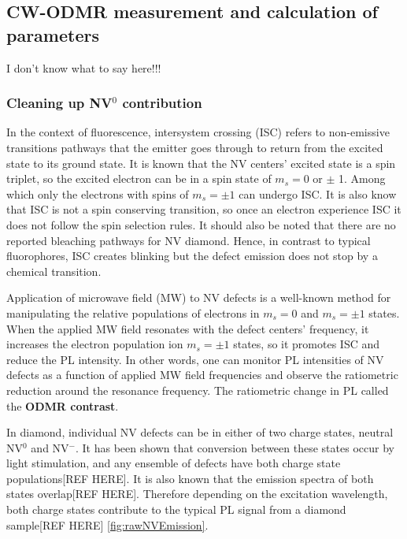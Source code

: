 \subsection{CW-ODMR measurement and calculation of parameters}
I don't know what to say here!!!
\subsubsection{Cleaning up NV$^{0}$ contribution}
In the context of fluorescence, intersystem crossing (ISC) refers to 
non-emissive transitions pathways that the emitter goes through to return from the 
excited state to its ground state. It is known that the NV centers' excited state 
is a spin triplet, so the excited electron can be in a spin state of $m_{s} = 0$ 
or $\pm$ 1. Among which only the electrons with spins of $m_{s} = \pm 1$ can
undergo ISC. It is also know that ISC is not a spin conserving transition, so 
once an electron experience ISC it does not follow the spin selection rules.
It should also be noted that there are no reported bleaching pathways for NV diamond.
Hence, in contrast to typical fluorophores, ISC creates blinking but the defect 
emission does not stop by a chemical transition. 

Application of microwave field (MW) to NV defects is a well-known method for manipulating the relative populations of electrons in $m_{s} = 0$ and 
$m_{s} = \pm 1$ states. When the applied MW field resonates with the defect 
centers' frequency, it increases the electron population ion $m_{s} = \pm 1$ 
states, so it promotes ISC and reduce the PL intensity. In other words, one can 
monitor PL intensities of NV defects as a function of applied MW field frequencies 
and observe the ratiometric reduction around the resonance frequency. The 
ratiometric change in PL called the \textbf{ODMR contrast}. 

In diamond, individual NV defects can be in either of two charge states, neutral 
NV$^{0}$ and NV$^{-}$. It has been shown that conversion between these states 
occur by light stimulation, and any ensemble of defects have both charge state
populations[REF HERE]. It is also known that the emission spectra of both states 
overlap[REF HERE]. Therefore depending on the excitation wavelength, 
both charge states contribute to the typical PL signal from a diamond sample[REF 
HERE] \ref{fig:rawNVEmission}.

